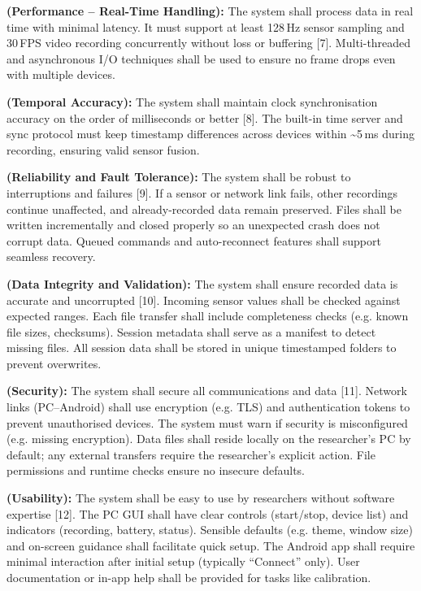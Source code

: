 \begin{description}[style=unboxed,leftmargin=0cm]
    \item[\textbf{NFR1}] \textbf{(Performance – Real-Time Handling):} The system shall process data in real time with minimal latency. It must support at least 128\,Hz sensor sampling and 30\,FPS video recording concurrently without loss or buffering [7]. Multi-threaded and asynchronous I/O techniques shall be used to ensure no frame drops even with multiple devices.

    \item[\textbf{NFR2}] \textbf{(Temporal Accuracy):} The system shall maintain clock synchronisation accuracy on the order of milliseconds or better [8]. The built-in time server and sync protocol must keep timestamp differences across devices within \textasciitilde5\,ms during recording, ensuring valid sensor fusion.

    \item[\textbf{NFR3}] \textbf{(Reliability and Fault Tolerance):} The system shall be robust to interruptions and failures [9]. If a sensor or network link fails, other recordings continue unaffected, and already-recorded data remain preserved. Files shall be written incrementally and closed properly so an unexpected crash does not corrupt data. Queued commands and auto-reconnect features shall support seamless recovery.

    \item[\textbf{NFR4}] \textbf{(Data Integrity and Validation):} The system shall ensure recorded data is accurate and uncorrupted [10]. Incoming sensor values shall be checked against expected ranges. Each file transfer shall include completeness checks (e.g. known file sizes, checksums). Session metadata shall serve as a manifest to detect missing files. All session data shall be stored in unique timestamped folders to prevent overwrites.

    \item[\textbf{NFR5}] \textbf{(Security):} The system shall secure all communications and data [11]. Network links (PC–Android) shall use encryption (e.g. TLS) and authentication tokens to prevent unauthorised devices. The system must warn if security is misconfigured (e.g. missing encryption). Data files shall reside locally on the researcher’s PC by default; any external transfers require the researcher’s explicit action. File permissions and runtime checks ensure no insecure defaults.

    \item[\textbf{NFR6}] \textbf{(Usability):} The system shall be easy to use by researchers without software expertise [12]. The PC GUI shall have clear controls (start/stop, device list) and indicators (recording, battery, status). Sensible defaults (e.g. theme, window size) and on-screen guidance shall facilitate quick setup. The Android app shall require minimal interaction after initial setup (typically “Connect” only). User documentation or in-app help shall be provided for tasks like calibration.


\end{description}
